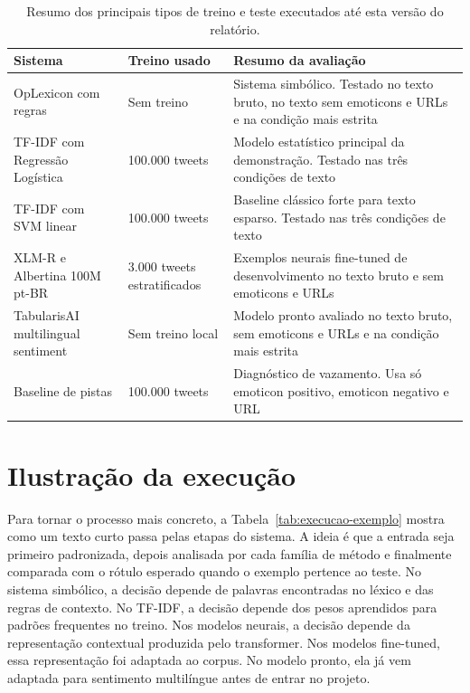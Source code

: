 \documentclass[11pt,a4paper]{article}
\newcommand{\altrowcolors}{\rowcolors{2}{black!4}{white}}
\newcommand{\clearrowcolors}{\rowcolors{2}{}{}}
\begin{document}
\begin{table}[h]
\small
\centering
\renewcommand{\arraystretch}{1.16}
\altrowcolors
\begin{tabularx}{\linewidth}{@{}L{3.25cm}L{2.2cm}Y@{}}
\toprule
\textbf{Sistema} & \textbf{Treino usado} & \textbf{Resumo da avaliação} \\
\midrule
OpLexicon com regras & Sem treino & Sistema simbólico. Testado no texto bruto, no texto sem emoticons e URLs e na condição mais estrita \\
\addlinespace[0.3em]
TF-IDF com Regressão Logística & 100.000 tweets & Modelo estatístico principal da demonstração. Testado nas três condições de texto \\
\addlinespace[0.3em]
TF-IDF com SVM linear & 100.000 tweets & Baseline clássico forte para texto esparso. Testado nas três condições de texto \\
\addlinespace[0.3em]
XLM-R e Albertina 100M pt-BR & 3.000 tweets estratificados & Exemplos neurais fine-tuned de desenvolvimento no texto bruto e sem emoticons e URLs \\
\addlinespace[0.3em]
TabularisAI multilingual sentiment & Sem treino local & Modelo pronto avaliado no texto bruto, sem emoticons e URLs e na condição mais estrita \\
\addlinespace[0.3em]
Baseline de pistas & 100.000 tweets & Diagnóstico de vazamento. Usa só emoticon positivo, emoticon negativo e URL \\
\bottomrule
\end{tabularx}
\clearrowcolors
\caption{Resumo dos principais tipos de treino e teste executados até esta versão do relatório.}
\label{tab:treinos}
\end{table}

\section{Ilustração da execução}

Para tornar o processo mais concreto, a Tabela~\ref{tab:execucao-exemplo} mostra como um texto curto passa pelas etapas do sistema. A ideia é que a entrada seja primeiro padronizada, depois analisada por cada família de método e finalmente comparada com o rótulo esperado quando o exemplo pertence ao teste. No sistema simbólico, a decisão depende de palavras encontradas no léxico e das regras de contexto. No TF-IDF, a decisão depende dos pesos aprendidos para padrões frequentes no treino. Nos modelos neurais, a decisão depende da representação contextual produzida pelo transformer. Nos modelos fine-tuned, essa representação foi adaptada ao corpus. No modelo pronto, ela já vem adaptada para sentimento multilíngue antes de entrar no projeto.
\end{document}
